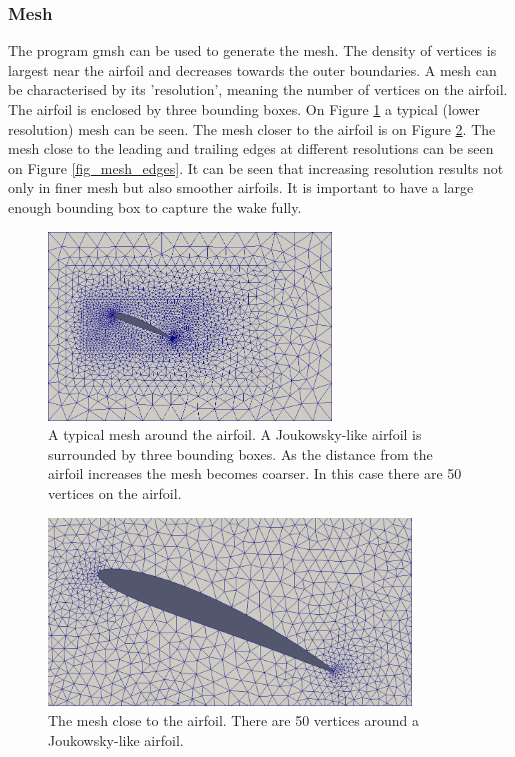 \documentclass[12pt, a4paper]{article}
\begin{document}
        \subsubsection{Mesh}
            The program gmsh can be used to generate the mesh. The density of vertices is largest near the airfoil and decreases towards the outer boundaries. A mesh can be characterised by its 'resolution', meaning the number of vertices on the airfoil. The airfoil is enclosed by three bounding boxes. On Figure \ref{fig_mesh_full} a typical (lower resolution) mesh can be seen. The mesh closer to the airfoil is on Figure \ref{fig_mesh_close}. The mesh close to the leading and trailing edges at different resolutions can be seen on Figure \ref{fig_mesh_edges}. It can be seen that increasing resolution results not only in finer mesh but also smoother airfoils. It is important to have a large enough bounding box to capture the wake fully.
            \begin{figure}[htbp]
                \centering
                \includegraphics[height=5cm]{mesh_1}
                \caption{A typical mesh around the airfoil. A Joukowsky-like airfoil is surrounded by three bounding boxes. As the distance from the airfoil increases the mesh becomes coarser. In this case there are 50 vertices on the airfoil.}
                \label{fig_mesh_full}
            \end{figure}
            \begin{figure}[htbp]
                \centering
                \includegraphics[height=5cm]{mesh_2}
                \caption{The mesh close to the airfoil. There are 50 vertices around a Joukowsky-like airfoil.}
                \label{fig_mesh_close}
            \end{figure}
\end{document}
